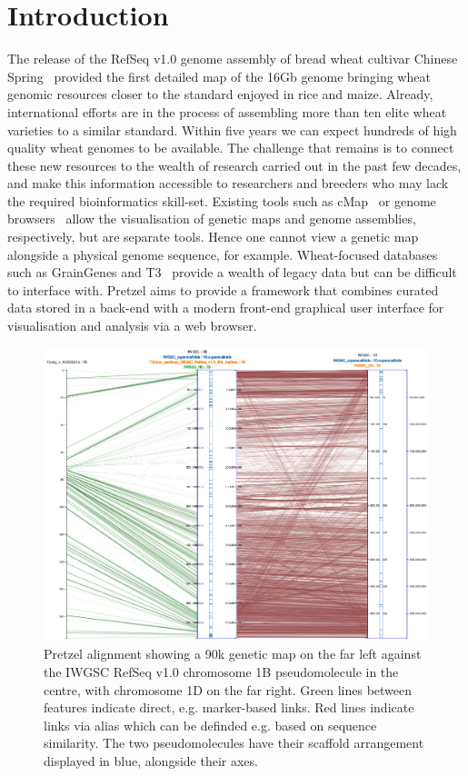 
\section{Introduction}

The release of the RefSeq v1.0 genome assembly of bread wheat cultivar Chinese
Spring~\citep{IWGSC2018} provided the first detailed map of the 16Gb genome bringing wheat genomic
resources closer to the standard enjoyed in rice and maize. 
%
Already, international efforts are in the process of assembling more than ten elite wheat varieties
to a similar standard. 
%
Within five years we can expect hundreds of high quality wheat genomes to be available. 
%
The challenge that remains is to connect these new resources to the wealth of research carried out
in the past few decades, and make this information accessible to researchers and breeders who may
lack the required bioinformatics skill-set.
%
Existing tools such as cMap~\citep{fang2003cmap} or genome
browsers~\citep{Stein2013GBrowse,Buels2016JBrowse} allow the visualisation of genetic maps and genome
assemblies, respectively, but are separate tools. Hence one cannot view a genetic map alongside a
physical genome sequence, for example. 
%
Wheat-focused databases such as GrainGenes and T3~\citep{Blake2016T3} provide a wealth of legacy
data but can be difficult to interface with. 
%
Pretzel aims to provide a framework that combines curated data stored in a back-end with a
modern front-end graphical user interface for visualisation and analysis via a web browser. 
%
\begin{figure}
\centering
  \includegraphics[width=\textwidth]{pretzel.png}
\caption{
  Pretzel alignment showing a 90k genetic map on the far left against the IWGSC RefSeq v1.0 chromosome 1B pseudomolecule in the centre, 
  with chromosome 1D on the far right. 
  Green lines between features indicate direct, e.g. marker-based links. 
  Red lines indicate links via alias which can be definded e.g. based on sequence similarity. 
  The two pseudomolecules have their scaffold arrangement displayed in blue, alongside their axes.
}
\label{fig:01}
\end{figure}
%
